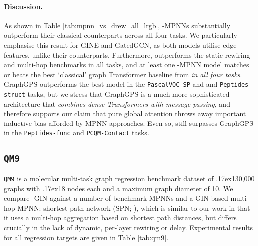 \documentclass{article}
\newcommand{\mytilde}{\raise.17ex\hbox{}}
\theoremstyle{plain}
\theoremstyle{definition}
\theoremstyle{remark}
\begin{document}
\paragraph{Discussion.}
As shown in Table \ref{tab:mpnn_vs_drew_all_lrgb}, -MPNNs substantially outperform their classical counterparts across all four tasks. We particularly emphasise this result for GINE and GatedGCN, as both models utilise edge features, unlike their  counterparts.
Furthermore,  outperforms the static rewiring and multi-hop benchmarks in all tasks, and at least one -MPNN model matches or beats the best `classical' graph Transformer baseline from \citet{dwivedi2022long} \emph{in all four tasks}. GraphGPS \cite{rampavsek2022recipe} outperforms the best  model in the \texttt{PascalVOC-SP} and and \texttt{Peptides-struct} tasks, but we stress that GraphGPS is a much more sophisticated architecture that \emph{combines dense Transformers with message passing}, and therefore supports our claim that pure global attention throws away important inductive bias afforded by MPNN approaches. Even so,  still surpasses GraphGPS in the \texttt{Peptides-func} and \texttt{PCQM-Contact} tasks.




\subsection{\texttt{QM9}}
\texttt{QM9} \cite{ramakrishnan2014quantum} is a molecular multi-task graph regression benchmark dataset of \mytilde130,000 graphs with \mytilde18 nodes each and a maximum graph diameter of 10.
We compare -GIN against a number of benchmark MPNNs and a GIN-based multi-hop MPNN: shortest path network (SPN; \citet{abboud2022shortest}), which is similar to our work in that it uses a multi-hop aggregation based on shortest path distances, but differs crucially in the lack of dynamic, per-layer rewiring or delay. Experimental results for all regression targets are given in Table \ref{tab:qm9}.
\end{document}
